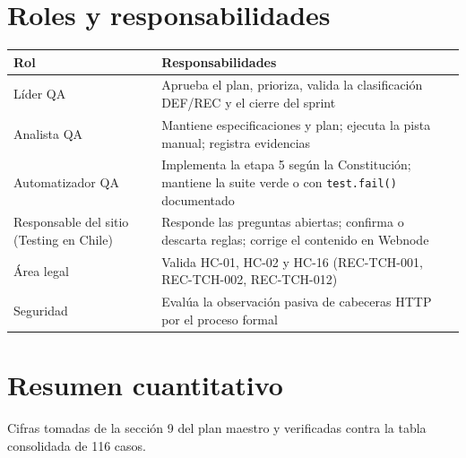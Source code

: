 \documentclass[11pt,a4paper]{article}
\begin{document}
\section{Roles y responsabilidades}

\begin{table}[H]
\centering\small
\begin{tabularx}{\textwidth}{@{}>{\raggedright\arraybackslash}p{} X@{}}
\toprule
Rol & Responsabilidades \\
\midrule
Líder QA & Aprueba el plan, prioriza, valida la clasificación DEF/REC y el cierre del sprint \\
Analista QA & Mantiene especificaciones y plan; ejecuta la pista manual; registra evidencias \\
Automatizador QA & Implementa la etapa 5 según la Constitución; mantiene la suite verde o con \texttt{test.fail()} documentado \\
Responsable del sitio (Testing en Chile) & Responde las preguntas abiertas; confirma o descarta reglas; corrige el contenido en Webnode \\
Área legal & Valida HC-01, HC-02 y HC-16 (REC-TCH-001, REC-TCH-002, REC-TCH-012) \\
Seguridad & Evalúa la observación pasiva de cabeceras HTTP por el proceso formal \\
\bottomrule
\end{tabularx}
\end{table}

\section{Resumen cuantitativo}

Cifras tomadas de la sección 9 del plan maestro y verificadas contra la tabla consolidada de 116 casos.
\end{document}
